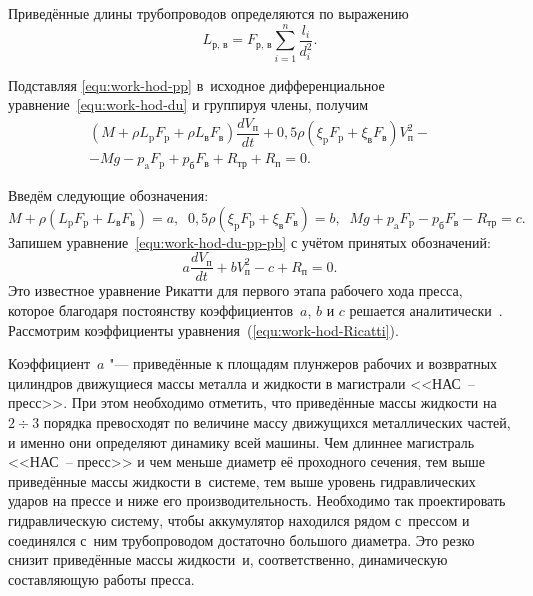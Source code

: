 Приведённые длины трубопроводов определяются по выражению
\begin{equation}
    L_\text{р, в}=F_\text{р, в} \sum_{i=1}^n\dfrac{l_{i}}{d^{2}_{i}}.
\label{equ:work-hod-Lpb}
\end{equation}

Подставляя \eqref{equ:work-hod-pp} в~исходное дифференциальное уравнение~\eqref{equ:work-hod-du} и группируя члены, получим
\begin{multline}
      \left(M+\rho  L_\text{p}  F_\text{p}+\rho  L_\text{в}  F_\text{в}
      \right)\dfrac{d V_\text{п} }{dt}+
     0,5 \rho \left( \xi_\text{p}  F_\text{p}+
       \xi_\text{в}  F_\text{в}\right)  V^{2}_\text{п}-\\
      -       M  g- p_\text{a}  F_\text{p}+ p_\text{б}  F_\text{в}+R_\text{тр}+R_\text{п}=0.
\label{equ:work-hod-du-pp-pb}
\end{multline}

\pagebreak

Введём следующие обозначения:
\begin{equation}
     M+\rho ( L_\text{p}  F_\text{p}+L_\text{в}  F_\text{в})=a, \; \;
%
     0,5 \rho (\xi_\text{p}  F_\text{p}+ \xi_\text{в}  F_\text{в})=b, \; \;
%
     M  g+ p_\text{a}  F_\text{p}- p_\text{б}  F_\text{в}-R_\text{тр}=c.
\label{equ:work-hod-Ricatti-c}
\end{equation}
Запишем  уравнение~\eqref{equ:work-hod-du-pp-pb} с учётом принятых обозначений:
\begin{equation}
 \displaystyle
    a\dfrac{d V_\text{п} }{dt}+b  V^{2}_\text{п}-c+R_\text{п}=0.
\label{equ:work-hod-Ricatti}
\end{equation}
Это известное уравнение Рикатти для первого этапа рабочего хода пресса, которое благодаря постоянству коэффициентов~$ a $, $ b $  и $ c $ решается аналитически~\cite{bib:Belov}.
Рассмотрим коэффициенты уравнения~(\ref{equ:work-hod-Ricatti}).

Коэффициент~$ a $ "---  приведённые к площадям плунжеров рабочих и возвратных цилиндров движущиеся массы металла и жидкости в магистрали <<НАС~--  пресс>>. 
При этом необходимо отметить, что приведённые массы жидкости на $ 2\div3 $ порядка превосходят по величине массу движущихся металлических частей, и именно они определяют динамику всей машины. 
Чем длиннее магистраль <<НАС~--  пресс>> и чем меньше диаметр её проходного сечения, тем выше приведённые массы жидкости в~системе, тем выше уровень гидравлических ударов на прессе и ниже его производительность. 
Необходимо так проектировать гидравлическую систему, чтобы аккумулятор находился рядом с~прессом и соединялся с~ним трубопроводом достаточно большого диаметра. 
Это резко снизит приведённые массы жидкости~и, соответственно, динамическую составляющую работы пресса.

